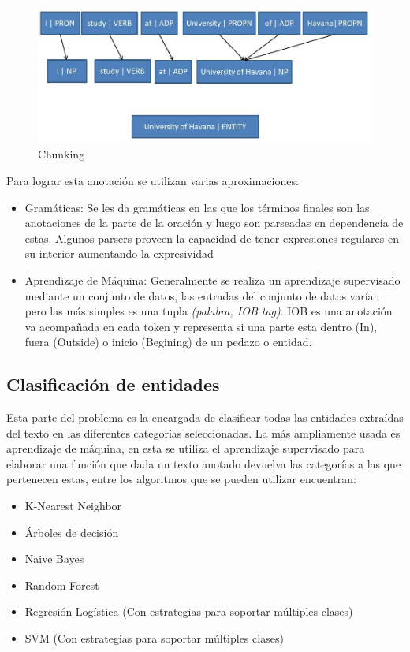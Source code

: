 \documentclass[runningheads]{llncs}
\begin{document}
\begin{figure}
\includegraphics[width=\textwidth]{namedentity.jpg}
\caption{Chunking} \label{chunkingfig}
\end{figure}

Para lograr esta anotación se utilizan varias aproximaciones:

\begin{itemize}

\item Gramáticas: Se les da gramáticas en las que los términos finales son las anotaciones de la parte de la
oración y luego son parseadas en dependencia de estas. Algunos parsers proveen la capacidad de 
tener expresiones regulares en su interior aumentando la expresividad \cite{nltkgrammar}

\item Aprendizaje de Máquina: Generalmente se realiza un aprendizaje supervisado mediante un conjunto de datos, las entradas del conjunto de datos varían pero las más simples es una tupla \emph{(palabra, IOB tag)}.  IOB es una anotación va acompañada en cada token y representa si una parte esta dentro (In), fuera (Outside) o inicio (Begining) de un pedazo o entidad.

\end{itemize}

\subsection{Clasificación de entidades}

Esta parte del problema es la encargada de clasificar todas las entidades extraídas del texto en las diferentes categorías seleccionadas. La más ampliamente usada es aprendizaje de máquina, en esta se utiliza el aprendizaje supervisado para elaborar una función que dada un texto anotado devuelva las categorías a las que pertenecen estas, entre los algoritmos que se pueden utilizar encuentran:

\begin{itemize}

\item K-Nearest Neighbor
\item Árboles de decisión
\item Naive Bayes
\item Random Forest
\item Regresión Logística (Con estrategias para soportar múltiples clases)
\item SVM (Con estrategias para soportar múltiples clases)

\end{itemize}
\end{document}
